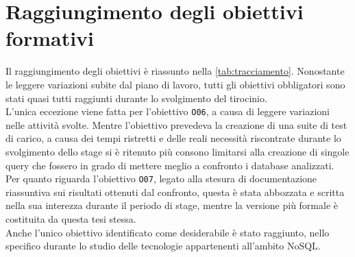 \section{Raggiungimento degli obiettivi formativi}

Il raggiungimento degli obiettivi è riassunto nella \autoref{tab:tracciamento}. Nonostante le leggere variazioni subite dal piano di lavoro, tutti gli obiettivi obbligatori sono stati quasi tutti raggiunti durante lo svolgimento del tirocinio.\\
L'unica eccezione viene fatta per l'obiettivo \texttt{O06}, a causa di leggere variazioni nelle attività svolte. Mentre l'obiettivo prevedeva la creazione di una suite di test di carico, a causa dei tempi ristretti e delle reali necessità riscontrate durante lo svolgimento dello stage si è ritenuto più consono limitarsi alla creazione di singole query che fossero in grado di mettere meglio a confronto i database analizzati.\\
Per quanto riguarda l'obiettivo \texttt{O07}, legato alla stesura di documentazione riassuntiva sui risultati ottenuti dal confronto, questa è stata abbozzata e scritta nella sua interezza durante il periodo di stage, mentre la  versione più formale è costituita da questa tesi stessa.\\
Anche l'unico obiettivo identificato come desiderabile è stato raggiunto, nello specifico durante lo studio delle tecnologie appartenenti all'ambito NoSQL.


